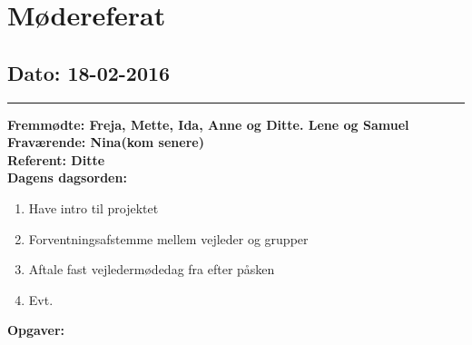 \chapter{Mødereferat}

\section{Dato: 18-02-2016}
\hrule
\textbf{Fremmødte: Freja, Mette, Ida, Anne og Ditte. Lene og Samuel} \\
\textbf{Fraværende: Nina(kom senere)} \\
\textbf{Referent: Ditte } \\
\textbf{Dagens dagsorden: }
\begin{enumerate}
	\item Have intro til projektet
	\item Forventningsafstemme mellem vejleder og grupper
	\item Aftale fast vejledermødedag fra efter påsken
	\item Evt. 
\end{enumerate}

\textbf{Opgaver:} \newline

